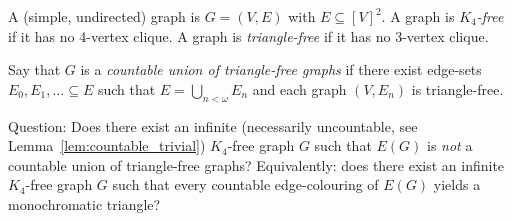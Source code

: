 A (simple, undirected) graph is $G=(V,E)$ with $E\subseteq [V]^2$.
A graph is \emph{$K_4$-free} if it has no 4-vertex clique.
A graph is \emph{triangle-free} if it has no 3-vertex clique.

Say that $G$ is a \emph{countable union of triangle-free graphs} if there exist edge-sets $E_0,E_1,\dots\subseteq E$ such that $E=\bigcup_{n<\omega} E_n$ and each graph $(V,E_n)$ is triangle-free.

Question: Does there exist an infinite (necessarily uncountable, see Lemma~\ref{lem:countable_trivial}) $K_4$-free graph $G$ such that $E(G)$ is \emph{not} a countable union of triangle-free graphs?
Equivalently: does there exist an infinite $K_4$-free graph $G$ such that every countable edge-colouring of $E(G)$ yields a monochromatic triangle?
